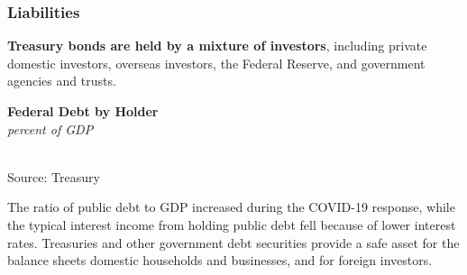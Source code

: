 \documentclass{report}
\makeatletter
\newcommand{\tbllink}[1]{\href{https://raw.githubusercontent.com/bdecon/US-chartbook/master/chartbook/data/#1}{\faTable}}
\newcommand*\short[1]{\expandafter\@gobbletwo\number\numexpr#1\relax}
\newcommand{\sbar}[4]{
		\addplot[ybar stacked, bar width=2.45pt, draw opacity=0, fill=#1] 
			table [x=#2, y=#3, col sep=comma]{#4};}
\newcommand{\dateaxisticks}{
		date coordinates in=x, axis line style={draw=none},
		xmax={2022-03-15},
		max space between ticks=40,	    
		xtick={{1990-01-01}, {1992-01-01}, {1994-01-01}, 
			{1996-01-01}, {1998-01-01}, {2000-01-01}, 
			{2002-01-01}, {2004-01-01}, {2006-01-01},
			{2008-01-01}, {2010-01-01}, {2012-01-01}, {2014-01-01},
		    {2016-01-01}, {2018-01-01}, {2020-01-01}, {2022-01-01}, 
		    {2024-01-01}, {2026-01-01}},
		minor xtick={{1989-01-01}, {1991-01-01}, {1993-01-01},
			{1995-01-01}, {1997-01-01}, {1999-01-01}, 
			{2001-01-01}, {2003-01-01}, {2005-01-01}, {2007-01-01},
		    {2009-01-01}, {2011-01-01}, {2013-01-01}, {2015-01-01},
		    {2017-01-01}, {2019-01-01}, {2021-01-01}, {2023-01-01}, 
		    {2025-01-01}, {2027-01-01}},
		enlarge y limits={0.06}, enlarge x limits={0.01},
		}
\newcommand{\bbar}[2]{extra #1 ticks = {{#2}}, extra #1 tick labels = ,
		extra #1 tick style = {grid=major, grid style={thick, black!25}},}
\newcommand{\rbars}{
		\fill[color=black!10] (axis cs:{1990-07-01},\pgfkeysvalueof{/pgfplots/ymin}) rectangle 
			(axis cs:{1991-03-01}, \pgfkeysvalueof{/pgfplots/ymax});
		\fill[color=black!10] (axis cs:{2007-12-01},\pgfkeysvalueof{/pgfplots/ymin}) rectangle 
			(axis cs:{2009-07-01}, \pgfkeysvalueof{/pgfplots/ymax});
		\fill[color=black!10] (axis cs:{2001-03-01},\pgfkeysvalueof{/pgfplots/ymin}) rectangle 
			(axis cs:{2001-11-01}, \pgfkeysvalueof{/pgfplots/ymax});
		\fill[color=black!10] (axis cs:{2020-02-01},\pgfkeysvalueof{/pgfplots/ymin}) rectangle 
			(axis cs:{2020-05-01}, \pgfkeysvalueof{/pgfplots/ymax});}
\makeatother
\begin{document}
{\begin{minipage}{0.76\textwidth}
\end{minipage}
\newpage
\begin{minipage}{0.76\textwidth}
\subsubsection*{Liabilities}
\small \textbf{Treasury bonds are held by a mixture of investors}, including private domestic investors, overseas investors, the Federal Reserve, and government agencies and trusts. 
\vspace{2mm}

\normalsize \textbf{Federal Debt by Holder}\\
\footnotesize{\textit{percent of GDP}}\\
\hspace*{-2mm} \\
\footnotesize{Source: Treasury} \hfill \tbllink{pubdebt.csv}
\vspace{2mm}

\small The ratio of public debt to GDP increased during the COVID-19 response, while the typical interest income from holding public debt fell because of lower interest rates. Treasuries and other government debt securities provide a safe asset for the balance sheets domestic households and businesses, and for foreign investors.
\end{minipage}
}
\end{document}
